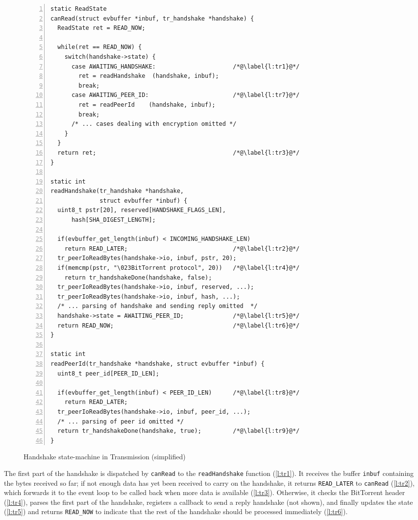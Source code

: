 \documentclass[a4paper]{llncs}
\begin{document}
\begin{figure}[tbp]
\begin{spacing}{0.8}
\begin{lstlisting}[numbers=left,xleftmargin=0pt]
static ReadState
canRead(struct evbuffer *inbuf, tr_handshake *handshake) {
  ReadState ret = READ_NOW;

  while(ret == READ_NOW) {
    switch(handshake->state) {
      case AWAITING_HANDSHAKE:                      /*@\label{l:tr1}@*/
        ret = readHandshake  (handshake, inbuf);
        break;
      case AWAITING_PEER_ID:                        /*@\label{l:tr7}@*/
        ret = readPeerId    (handshake, inbuf);
        break;
      /* ... cases dealing with encryption omitted */
    }
  }
  return ret;                                       /*@\label{l:tr3}@*/
}

static int
readHandshake(tr_handshake *handshake,
              struct evbuffer *inbuf) {
  uint8_t pstr[20], reserved[HANDSHAKE_FLAGS_LEN],
      hash[SHA_DIGEST_LENGTH];

  if(evbuffer_get_length(inbuf) < INCOMING_HANDSHAKE_LEN)
    return READ_LATER;                              /*@\label{l:tr2}@*/
  tr_peerIoReadBytes(handshake->io, inbuf, pstr, 20);
  if(memcmp(pstr, "\023BitTorrent protocol", 20))   /*@\label{l:tr4}@*/
    return tr_handshakeDone(handshake, false);
  tr_peerIoReadBytes(handshake->io, inbuf, reserved, ...);
  tr_peerIoReadBytes(handshake->io, inbuf, hash, ...);
  /* ... parsing of handshake and sending reply omitted  */
  handshake->state = AWAITING_PEER_ID;              /*@\label{l:tr5}@*/
  return READ_NOW;                                  /*@\label{l:tr6}@*/
}

static int
readPeerId(tr_handshake *handshake, struct evbuffer *inbuf) {
  uint8_t peer_id[PEER_ID_LEN];

  if(evbuffer_get_length(inbuf) < PEER_ID_LEN)      /*@\label{l:tr8}@*/
    return READ_LATER;
  tr_peerIoReadBytes(handshake->io, inbuf, peer_id, ...);
  /* ... parsing of peer id omitted */
  return tr_handshakeDone(handshake, true);         /*@\label{l:tr9}@*/
}
\end{lstlisting}
\end{spacing}
\caption{Handshake state-machine in Transmission (simplified)}
\label{fig:transmission}
\end{figure}

The first part of the handshake is dispatched by \texttt{canRead} to the
\texttt{read\-Hand\-shake} function (\cref{l:tr1}).  It receives the buffer \texttt{inbuf}
containing the bytes received so far; if not enough data has yet been received
to carry on the handshake, it returns \texttt{READ\_LATER} to \texttt{canRead} (\cref{l:tr2}),
which forwards it to the event loop to be called back when more data is
available (\cref{l:tr3}).  Otherwise, it checks the BitTorrent header (\cref{l:tr4}), parses the
first part of the handshake, registers a callback to send a reply handshake
(not shown), and finally updates the state (\cref{l:tr5}) and returns \texttt{READ\_NOW} to
indicate that the rest of the handshake should be processed immediately (\cref{l:tr6}).
\end{document}
